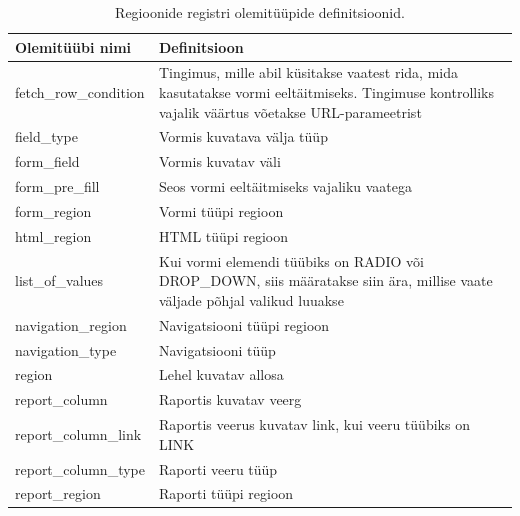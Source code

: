\documentclass[a4paper,12pt]{article} %
\begin{document}
\begin{table}[H]
\centering
\caption{Regioonide registri olemitüüpide definitsioonid.}
\label{table_er_regioonide_registri_olemitüüpide_definitsioonid}
\begin{tabular}{|p{4cm}|p{11cm}|}
\hline
\rowcolor{rowgray}
Olemitüübi nimi & Definitsioon \\ \hline
fetch\_row\_condition & Tingimus, mille abil küsitakse vaatest rida, mida kasutatakse vormi eeltäitmiseks. Tingimuse kontrolliks vajalik väärtus võetakse URL-parameetrist \\ \hline
field\_type & Vormis kuvatava välja tüüp \\ \hline
form\_field & Vormis kuvatav väli \\ \hline
form\_pre\_fill & Seos vormi eeltäitmiseks vajaliku vaatega \\ \hline
form\_region & Vormi tüüpi regioon \\ \hline
html\_region & HTML tüüpi regioon \\ \hline
list\_of\_values & Kui vormi elemendi tüübiks on RADIO või DROP\_DOWN, siis määratakse siin ära, millise vaate väljade põhjal valikud luuakse \\ \hline
navigation\_region & Navigatsiooni tüüpi regioon \\ \hline
navigation\_type & Navigatsiooni tüüp\\ \hline
region & Lehel kuvatav allosa \\ \hline
report\_column & Raportis kuvatav veerg \\ \hline
report\_column\_link & Raportis veerus kuvatav link, kui veeru tüübiks on LINK \\ \hline
report\_column\_type & Raporti veeru tüüp \\ \hline
report\_region & Raporti tüüpi regioon \\ \hline
\end{tabular}
\end{table}
\end{document}
